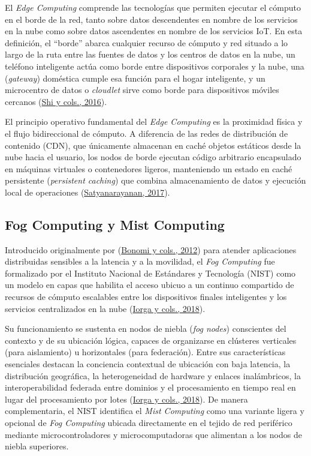\documentclass[12pt, letterpaper]{article}
\begin{document}
El \textit{Edge Computing} comprende las tecnologías que permiten ejecutar el cómputo en el borde de la red, tanto sobre datos descendentes en nombre de los servicios en la nube como sobre datos ascendentes en nombre de los servicios IoT. En esta definición, el ``borde'' abarca cualquier recurso de cómputo y red situado a lo largo de la ruta entre las fuentes de datos y los centros de datos en la nube, un teléfono inteligente actúa como borde entre dispositivos corporales y la nube, una (\textit{gateway}) doméstica cumple esa función para el hogar inteligente, y un microcentro de datos o \textit{cloudlet} sirve como borde para dispositivos móviles cercanos (\protect\hyperlink{shi2016}{Shi y cols., 2016}).

El principio operativo fundamental del \textit{Edge Computing} es la proximidad física y el flujo bidireccional de cómputo. A diferencia de las redes de distribución de contenido (CDN), que únicamente almacenan en caché objetos estáticos desde la nube hacia el usuario, los nodos de borde ejecutan código arbitrario encapsulado en máquinas virtuales o contenedores ligeros, manteniendo un estado en caché persistente (\textit{persistent caching}) que combina almacenamiento de datos y ejecución local de operaciones (\protect\hyperlink{satyanarayanan2017}{Satyanarayanan, 2017}).

\subsection{Fog Computing y Mist Computing}

Introducido originalmente por (\protect\hyperlink{bonomi2012}{Bonomi y cols., 2012}) para atender aplicaciones distribuidas sensibles a la latencia y a la movilidad, el \textit{Fog Computing} fue formalizado por el Instituto Nacional de Estándares y Tecnología (NIST) como un modelo en capas que habilita el acceso ubicuo a un continuo compartido de recursos de cómputo escalables entre los dispositivos finales inteligentes y los servicios centralizados en la nube (\protect\hyperlink{iorga2018}{Iorga y cols., 2018}).

Su funcionamiento se sustenta en nodos de niebla (\textit{fog nodes}) conscientes del contexto y de su ubicación lógica, capaces de organizarse en clústeres verticales (para aislamiento) u horizontales (para federación). Entre sus características esenciales destacan la conciencia contextual de ubicación con baja latencia, la distribución geográfica, la heterogeneidad de hardware y enlaces inalámbricos, la interoperabilidad federada entre dominios y el procesamiento en tiempo real en lugar del procesamiento por lotes (\protect\hyperlink{iorga2018}{Iorga y cols., 2018}). De manera complementaria, el NIST identifica el \textit{Mist Computing} como una variante ligera y opcional de \textit{Fog Computing} ubicada directamente en el tejido de red periférico mediante microcontroladores y microcomputadoras que alimentan a los nodos de niebla superiores.
\end{document}
